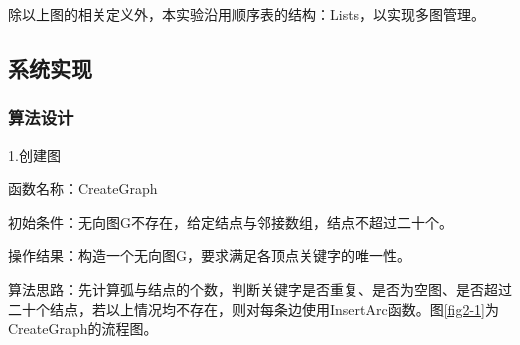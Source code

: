\documentclass[supercite]{Experimental_Report}
\theoremstyle{definition}
\begin{document}
除以上图的相关定义外，本实验沿用顺序表的结构：Lists，以实现多图管理。


\newpage

\subsection{系统实现}

\subsubsection{算法设计}

1.创建图

函数名称：CreateGraph

初始条件：无向图G不存在，给定结点与邻接数组，结点不超过二十个。

操作结果：构造一个无向图G，要求满足各顶点关键字的唯一性。

算法思路：先计算弧与结点的个数，判断关键字是否重复、是否为空图、是否超过二十个结点，若以上情况均不存在，则对每条边使用InsertArc函数。图\ref{fig2-1}为CreateGraph的流程图。
\end{document}
